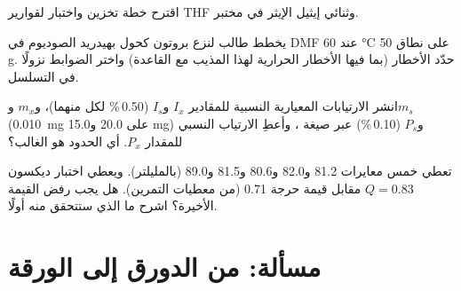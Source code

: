 \begin{exercise}[$\star\star$]\label{exo:b3:lab-techniques-3:9}
اقترح خطة تخزين واختبار لقوارير THF وثنائي إيثيل
الإيثر في مختبر.
\end{exercise}

\begin{exercise}[$\star\star\star$]\label{exo:b3:lab-techniques-3:10}
يخطط طالب لنزع بروتون كحول بهيدريد الصوديوم في DMF عند 60 °C على
نطاق 50 g. حدّد الأخطار (بما فيها الأخطار الحرارية لهذا المذيب مع
القاعدة) واختر الضوابط نزولًا في التسلسل.
\end{exercise}

\begin{exercise}[$\star\star\star$]\label{exo:b3:lab-techniques-3:11}
انشر الارتيابات المعيارية النسبية للمقادير $I_x$ و$I_s$ (0.50\,\% لكل منهما)، و$m_x$ و$m_s$ (\qty{0.010}{mg} على 20.0
و15.0 mg) و$P_s$ (0.10\,\%) عبر صيغة ، وأعطِ الارتياب النسبي للمقدار $P_x$.
أي الحدود هو الغالب؟
\end{exercise}

\begin{exercise}[$\star\star\star$]\label{exo:b3:lab-techniques-3:12}
تعطي خمس معايرات 81.2 و82.0 و80.6 و81.5 و89.0 (بالمليلتر). ويعطي اختبار ديكسون
$Q = 0.83$ مقابل قيمة حرجة 0.71 (من معطيات التمرين). هل يجب رفض القيمة
الأخيرة؟ اشرح ما الذي ستتحقق منه أولًا.
\end{exercise}

\section{مسألة: من الدورق إلى الورقة}

